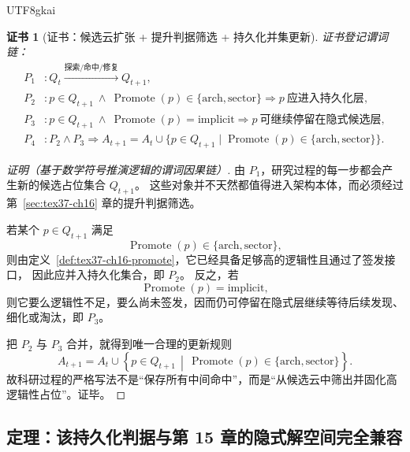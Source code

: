 \documentclass[12pt]{article}
\newtheorem{Certificate}{证书}[section]
\newcommand{\Promote}{\operatorname{Promote}}
\begin{document}
\begin{CJK*}{UTF8}{gkai}
\begin{Certificate}[证书：候选云扩张 + 提升判据筛选 + 持久化并集更新]
\label{cert:tex37-ch16-research}
证书登记谓词链：
\[
\begin{aligned}
  P_1 &: Q_t\xrightarrow{\text{探索/命中/修复}}Q_{t+1},\\
  P_2 &: p\in Q_{t+1}\ \wedge\ \Promote(p)\in\{\mathrm{arch},\mathrm{sector}\}
  \Rightarrow
  p\ \text{应进入持久化层},\\
  P_3 &: p\in Q_{t+1}\ \wedge\ \Promote(p)=\mathrm{implicit}
  \Rightarrow
  p\ \text{可继续停留在隐式候选层},\\
  P_4 &: P_2\wedge P_3
  \Rightarrow
  A_{t+1}
  =
  A_t\cup
  \{p\in Q_{t+1}\mid \Promote(p)\in\{\mathrm{arch},\mathrm{sector}\}\}.
\end{aligned}
\]
\end{Certificate}

\begin{proof}[证明（基于数学符号推演逻辑的谓词因果链）]
由 $P_1$，研究过程的每一步都会产生新的候选占位集合 $Q_{t+1}$。
这些对象并不天然都值得进入架构本体，而必须经过第~\ref{sec:tex37-ch16} 章的提升判据筛选。

若某个 $p\in Q_{t+1}$ 满足
\[
  \Promote(p)\in\{\mathrm{arch},\mathrm{sector}\},
\]
则由定义~\ref{def:tex37-ch16-promote}，它已经具备足够高的逻辑性且通过了签发接口，
因此应并入持久化集合，即 $P_2$。
反之，若
\[
  \Promote(p)=\mathrm{implicit},
\]
则它要么逻辑性不足，要么尚未签发，因而仍可停留在隐式层继续等待后续发现、细化或淘汰，即 $P_3$。

把 $P_2$ 与 $P_3$ 合并，就得到唯一合理的更新规则
\[
  A_{t+1}
  =
  A_t
  \cup
  \left\{
    p\in Q_{t+1}
    \,\middle|\,
    \Promote(p)\in\{\mathrm{arch},\mathrm{sector}\}
  \right\}.
\]
故科研过程的严格写法不是“保存所有中间命中”，而是“从候选云中筛出并固化高逻辑性占位”。证毕。
\end{proof}

\subsection{定理：该持久化判据与第 15 章的隐式解空间完全兼容}
\label{subsec:tex37-ch16-theorem-compatible}


\end{CJK*}
\end{document}

